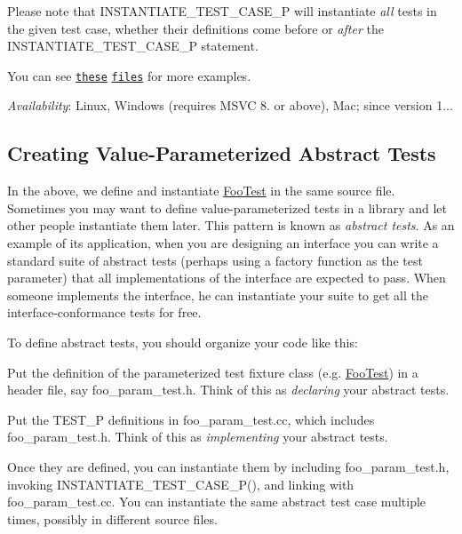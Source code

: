 Please note that {\ttfamily I\+N\+S\+T\+A\+N\+T\+I\+A\+T\+E\+\_\+\+T\+E\+S\+T\+\_\+\+C\+A\+S\+E\+\_\+P} will instantiate {\itshape all} tests in the given test case, whether their definitions come before or {\itshape after} the {\ttfamily I\+N\+S\+T\+A\+N\+T\+I\+A\+T\+E\+\_\+\+T\+E\+S\+T\+\_\+\+C\+A\+S\+E\+\_\+P} statement.

You can see \href{../samples/sample7_unittest.cc}{\tt these} \href{../samples/sample8_unittest.cc}{\tt files} for more examples.

{\itshape Availability}\+: Linux, Windows (requires M\+S\+VC 8. or above), Mac; since version 1...

\subsection*{Creating Value-\/\+Parameterized Abstract Tests}

In the above, we define and instantiate {\ttfamily \hyperlink{class_foo_test}{Foo\+Test}} in the same source file. Sometimes you may want to define value-\/parameterized tests in a library and let other people instantiate them later. This pattern is known as {\itshape abstract tests}. As an example of its application, when you are designing an interface you can write a standard suite of abstract tests (perhaps using a factory function as the test parameter) that all implementations of the interface are expected to pass. When someone implements the interface, he can instantiate your suite to get all the interface-\/conformance tests for free.

To define abstract tests, you should organize your code like this\+:


\begin{DoxyEnumerate}
\item Put the definition of the parameterized test fixture class (e.\+g. {\ttfamily \hyperlink{class_foo_test}{Foo\+Test}}) in a header file, say {\ttfamily foo\+\_\+param\+\_\+test.\+h}. Think of this as {\itshape declaring} your abstract tests.
\end{DoxyEnumerate}
\begin{DoxyEnumerate}
\item Put the {\ttfamily T\+E\+S\+T\+\_\+P} definitions in {\ttfamily foo\+\_\+param\+\_\+test.\+cc}, which includes {\ttfamily foo\+\_\+param\+\_\+test.\+h}. Think of this as {\itshape implementing} your abstract tests.
\end{DoxyEnumerate}

Once they are defined, you can instantiate them by including {\ttfamily foo\+\_\+param\+\_\+test.\+h}, invoking {\ttfamily I\+N\+S\+T\+A\+N\+T\+I\+A\+T\+E\+\_\+\+T\+E\+S\+T\+\_\+\+C\+A\+S\+E\+\_\+\+P()}, and linking with {\ttfamily foo\+\_\+param\+\_\+test.\+cc}. You can instantiate the same abstract test case multiple times, possibly in different source files.

